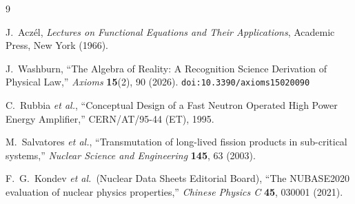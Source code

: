 \documentclass[12pt,a4paper]{article}
\theoremstyle{definition}
\theoremstyle{remark}
\begin{document}
\begin{thebibliography}{9}

J.~Acz\'el, \emph{Lectures on Functional Equations and Their Applications},
Academic Press, New York (1966).

J.~Washburn, ``The Algebra of Reality: A Recognition Science Derivation
of Physical Law,'' \emph{Axioms} \textbf{15}(2), 90 (2026).
\texttt{doi:10.3390/axioms15020090}

C.~Rubbia \textit{et al.}, ``Conceptual Design of a Fast Neutron Operated
High Power Energy Amplifier,'' CERN/AT/95-44 (ET), 1995.

M.~Salvatores \textit{et al.}, ``Transmutation of long-lived fission products
in sub-critical systems,'' \emph{Nuclear Science and Engineering} \textbf{145},
63 (2003).

F.~G.~Kondev \textit{et al.}\ (Nuclear Data Sheets Editorial Board),
``The NUBASE2020 evaluation of nuclear physics properties,''
\emph{Chinese Physics C} \textbf{45}, 030001 (2021).
\end{thebibliography}
\end{document}

